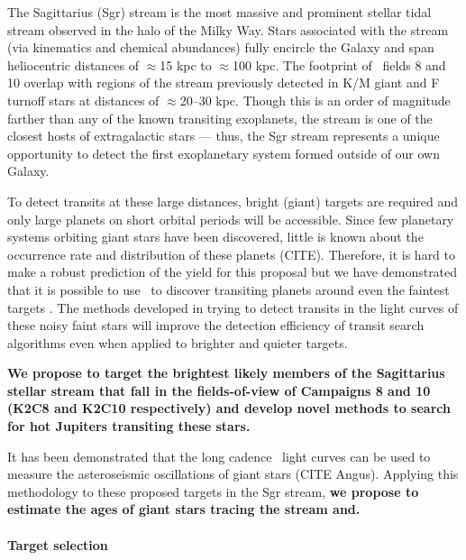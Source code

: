 \documentclass[letterpaper,12pt,preprint]{hack_aastex}
\begin{document}
The Sagittarius (Sgr) stream is the most massive and prominent stellar tidal
stream observed in the halo of the Milky Way. Stars associated with the stream
(via kinematics and chemical abundances) fully encircle the Galaxy and span
heliocentric distances of $\approx$15 kpc to $\approx$100 kpc. The footprint
of \KT\ fields 8 and 10 overlap with regions of the stream previously detected
in K/M giant and F turnoff stars \citep{Majewski:2003, Yanny:2009} at
distances of $\approx$20--30 kpc. Though this is an order of magnitude farther
than any of the known transiting exoplanets, the stream is one of the closest
hosts of extragalactic stars --- thus, the Sgr stream represents a unique
opportunity to detect the first exoplanetary system formed outside of our own
Galaxy.

To detect transits at these large distances, bright (giant) targets are
required and only large planets on short orbital periods will be accessible.
Since few planetary systems orbiting giant stars have been discovered, little
is known about the occurrence rate and distribution of these planets (CITE).
Therefore, it is hard to make a robust prediction of the yield for this
proposal but we have demonstrated that it is possible to use \KT\ to discover
transiting planets around even the faintest targets
\citep{Foreman-Mackey:2015}.
The methods developed in trying to detect transits in the light curves of
these noisy faint stars will improve the detection efficiency of transit
search algorithms even when applied to brighter and quieter targets.

{\bf We propose to target the brightest likely members of the Sagittarius
stellar stream that fall in the fields-of-view of Campaigns 8 and 10 (K2C8 and
K2C10 respectively) and develop novel methods to search for hot Jupiters
transiting these stars.}

It has been demonstrated that the long cadence \KT\ light curves can be used
to measure the asteroseismic oscillations of giant stars (CITE Angus).
Applying this methodology to these proposed targets in the Sgr stream, {\bf we
propose to estimate the ages of giant stars tracing the stream and.}


\paragraph{Target selection}
\end{document}
